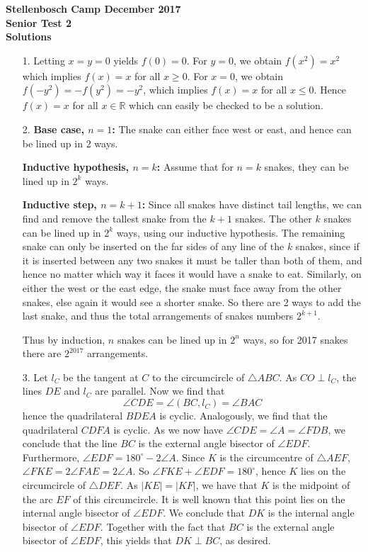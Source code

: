 \documentclass[a4paper, 12pt]{article}
\begin{document}
\begin{center}
\textbf{Stellenbosch Camp December 2017 \\ Senior Test 2} \\
\textbf{Solutions}
\end{center}

\begin{enumerate}

    \item[1.] Letting $x = y = 0$ yields $f(0) = 0$. For $y = 0$, we obtain $f(x^2) = x^2$ which implies $f(x) = x$ for all $x \geq 0$. For $x = 0$, we obtain $f(-y^2) = -f(y^2) = -y^2$, which implies $f(x) = x$ for all $x \leq 0$. Hence $f(x) = x$ for all $x \in \mathbb{R}$ which can easily be checked to be a solution.
    
    
    \item[2.] \textbf{Base case, $n =1$:} The snake can either face west or east, and hence can be lined up in 2 ways.
    
    \textbf{Inductive hypothesis, $n=k$:} Assume that for $n=k$ snakes, they can be lined up in $2^k$ ways.
    
    \textbf{Inductive step, $n=k+1$:} Since all snakes have distinct tail lengths, we can find and remove the tallest snake from the $k+1$ snakes. The other $k$ snakes can be lined up in $2^k$ ways, using our inductive hypothesis. The remaining snake can only be inserted on the far sides of any line of the $k$ snakes, since if it is inserted between any two snakes it must be taller than both of them, and hence no matter which way it faces it would have a snake to eat. Similarly, on either the west or the east edge, the snake must face away from the other snakes, else again it would see a shorter snake. So there are 2 ways to add the last snake, and thus the total arrangements of snakes numbers $2^{k+1}$.
    
    Thus by induction, $n$ snakes can be lined up in $2^n$ ways, so for 2017 snakes there are $2^{2017}$ arrangements.
    
    
    \item[3.] Let $l_C$ be the tangent at $C$ to the circumcircle of $\triangle ABC$. As $CO \perp l_C$, the lines $DE$ and $l_C$ are parallel. Now we find that
    $$ \angle CDE = \angle (BC, l_C) = \angle BAC $$
    hence the quadrilateral $BDEA$ is cyclic. Analogously, we find that the quadrilateral $CDFA$ is cyclic. As we now have $\angle CDE = \angle A = \angle FDB$, we conclude that the line $BC$ is the external angle bisector of $\angle EDF$. Furthermore, $\angle EDF = 180^\circ - 2 \angle A$. Since $K$ is the circumcentre of $\triangle AEF$, $\angle FKE = 2 \angle FAE = 2 \angle A$. So $\angle FKE + \angle EDF = 180^\circ$, hence $K$ lies on the circumcircle of $\triangle DEF$. As $|KE| = |KF|$, we have that $K$ is the midpoint of the arc $EF$ of this circumcircle. It is well known that this point lies on the internal angle bisector of $\angle EDF$. We conclude that $DK$ is the internal angle bisector of $\angle EDF$. Together with the fact that $BC$ is the external angle bisector of $\angle EDF$, this yields that $DK \perp BC$, as desired.
    

\end{enumerate}
\end{document}
